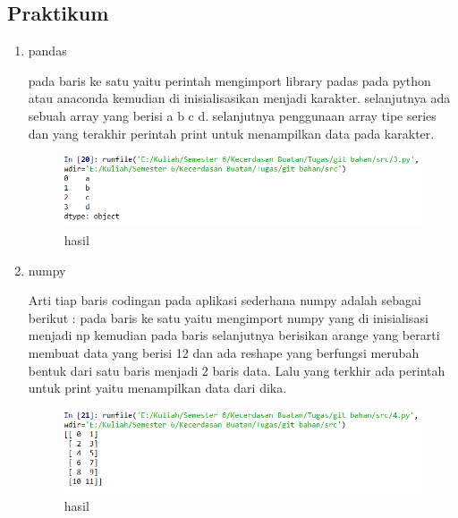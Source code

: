 \subsection{Praktikum}
\begin{enumerate}
\item pandas \par
pada baris ke satu yaitu perintah mengimport library padas pada python atau anaconda kemudian di inisialisasikan menjadi karakter. selanjutnya ada sebuah array yang berisi a b c d. selanjutnya penggunaan array tipe series dan yang terakhir perintah print untuk menampilkan data pada karakter.

\begin{figure}[ht]
\centering
\includegraphics[scale=0.5]{figures/1174012/3/3.PNG}
\caption{hasil}
\label{contoh}
\end{figure}

\item numpy\par
Arti tiap baris codingan pada aplikasi sederhana numpy adalah sebagai berikut : pada baris ke satu yaitu mengimport numpy yang di inisialisasi menjadi np kemudian pada baris selanjutnya berisikan arange yang berarti membuat data yang berisi 12 dan ada reshape yang berfungsi merubah bentuk dari satu baris menjadi 2 baris data. Lalu yang terkhir ada perintah untuk print yaitu menampilkan data dari dika.

\begin{figure}[ht]
\centering
\includegraphics[scale=0.5]{figures/1174012/3/4.PNG}
\caption{hasil}
\label{contoh}
\end{figure}


\end{enumerate}
